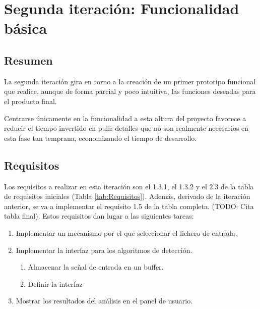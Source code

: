
\section{Segunda iteración: Funcionalidad básica}
    \subsection{Resumen}
        La segunda iteración gira en torno a la creación de un primer prototipo funcional que realice, aunque de forma parcial y poco intuitiva, las funciones deseadas para el producto final.

        Centrarse únicamente en la funcionalidad a esta altura del proyecto favorece a reducir el tiempo invertido en pulir detalles que no son realmente necesarios en esta fase tan temprana, economizando el tiempo de desarrollo.

    \subsection{Requisitos}
        Los requisitos a realizar en esta iteración son el 1.3.1, el 1.3.2 y el 2.3 de la tabla de requisitos iniciales (Tabla \ref{tab:Requisitos}). Además, derivado de la iteración anterior, se va a implementar el requisito 1.5 de la tabla completa. (TODO: Cita tabla final). Estos requisitos dan lugar a las siguientes tareas:
    
        \begin{enumerate}
            \item Implementar un mecanismo por el que seleccionar el fichero de entrada.
            \item Implementar la interfaz para los algoritmos de detección.
            \begin{enumerate}
                \item Almacenar la señal de entrada en un buffer.
                \item Definir la interfaz
            \end{enumerate}
            \item Mostrar los resultados del análisis en el panel de usuario.
        \end{enumerate}
        
